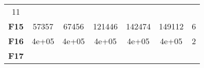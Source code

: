 \documentclass[12pt,a4paper]{article}
\begin{document}
\begin{longtable}[c]{@{}ccccccc@{}}
\begin{minipage}[t]{0.07\columnwidth}\centering\strut
11
\strut\end{minipage}\tabularnewline
\begin{minipage}[t]{0.11\columnwidth}\centering\strut
\textbf{F15}
\strut\end{minipage} &
\begin{minipage}[t]{0.08\columnwidth}\centering\strut
57357
\strut\end{minipage} &
\begin{minipage}[t]{0.08\columnwidth}\centering\strut
67456
\strut\end{minipage} &
\begin{minipage}[t]{0.09\columnwidth}\centering\strut
121446
\strut\end{minipage} &
\begin{minipage}[t]{0.10\columnwidth}\centering\strut
142474
\strut\end{minipage} &
\begin{minipage}[t]{0.11\columnwidth}\centering\strut
149112
\strut\end{minipage} &
\begin{minipage}[t]{0.07\columnwidth}\centering\strut
6
\strut\end{minipage}\tabularnewline
\begin{minipage}[t]{0.11\columnwidth}\centering\strut
\textbf{F16}
\strut\end{minipage} &
\begin{minipage}[t]{0.08\columnwidth}\centering\strut
4e+05
\strut\end{minipage} &
\begin{minipage}[t]{0.08\columnwidth}\centering\strut
4e+05
\strut\end{minipage} &
\begin{minipage}[t]{0.09\columnwidth}\centering\strut
4e+05
\strut\end{minipage} &
\begin{minipage}[t]{0.10\columnwidth}\centering\strut
4e+05
\strut\end{minipage} &
\begin{minipage}[t]{0.11\columnwidth}\centering\strut
4e+05
\strut\end{minipage} &
\begin{minipage}[t]{0.07\columnwidth}\centering\strut
2
\strut\end{minipage}\tabularnewline
\begin{minipage}[t]{0.11\columnwidth}\centering\strut
\textbf{F17}
\strut\end{minipage} &

\end{longtable}
\end{document}
